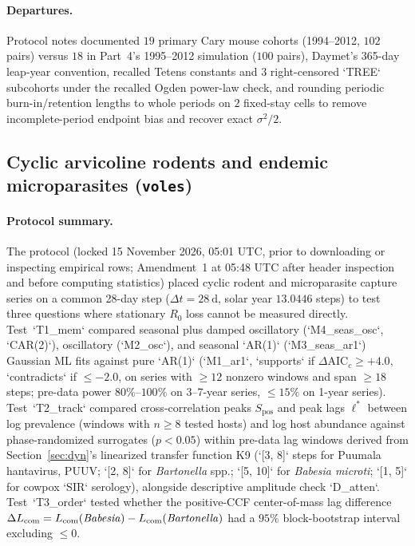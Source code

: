 \paragraph{Departures.}
Protocol notes documented $19$ primary Cary mouse cohorts (1994--2012, $102$ pairs) versus $18$ in Part~4's 1995--2012 simulation ($100$ pairs), Daymet's 365-day leap-year convention, recalled Tetens constants and $3$ right-censored `TREE` subcohorts under the recalled Ogden power-law check, and rounding periodic burn-in/retention lengths to whole periods on $2$ fixed-stay cells to remove incomplete-period endpoint bias and recover exact $\sigma^2/2$.

\subsection{Cyclic arvicoline rodents and endemic microparasites (\texttt{voles})}\label{num-esm-voles}

\paragraph{Protocol summary.}
The protocol (locked 15 November 2026, 05:01 UTC, prior to downloading or inspecting empirical rows; Amendment~1 at 05:48 UTC after header inspection and before computing statistics) placed cyclic rodent and microparasite capture series on a common 28-day step ($\Delta t = 28\ \mathrm{d}$, solar year $13.0446$ steps) to test three questions where stationary $R_0$ loss cannot be measured directly. Test~`T1\_mem` compared seasonal plus damped oscillatory (`M4\_seas\_osc`, `CAR(2)`), oscillatory (`M2\_osc`), and seasonal `AR(1)` (`M3\_seas\_ar1`) Gaussian ML fits against pure `AR(1)` (`M1\_ar1`, `supports` if $\Delta\mathrm{AIC}_c \ge +4.0$, `contradicts` if $\le -2.0$, on series with $\ge 12$ nonzero windows and span $\ge 18$ steps; pre-data power $80\%$--$100\%$ on 3--7-year series, $\le 15\%$ on 1-year series). Test~`T2\_track` compared cross-correlation peaks $S_{\mathrm{pos}}$ and peak lags $\ell^*$ between log prevalence (windows with $n \ge 8$ tested hosts) and log host abundance against phase-randomized surrogates ($p < 0.05$) within pre-data lag windows derived from Section~\ref{sec:dyn}'s linearized transfer function K9 (`[3, 8]` steps for Puumala hantavirus, PUUV; `[2, 8]` for \textit{Bartonella} spp.; `[5, 10]` for \textit{Babesia microti}; `[1, 5]` for cowpox `SIR` serology), alongside descriptive amplitude check `D\_atten`. Test~`T3\_order` tested whether the positive-CCF center-of-mass lag difference $\Delta L_{\mathrm{com}} = L_{\mathrm{com}}(\text{\textit{Babesia}}) - L_{\mathrm{com}}(\text{\textit{Bartonella}})$ had a $95\%$ block-bootstrap interval excluding $\le 0$.

